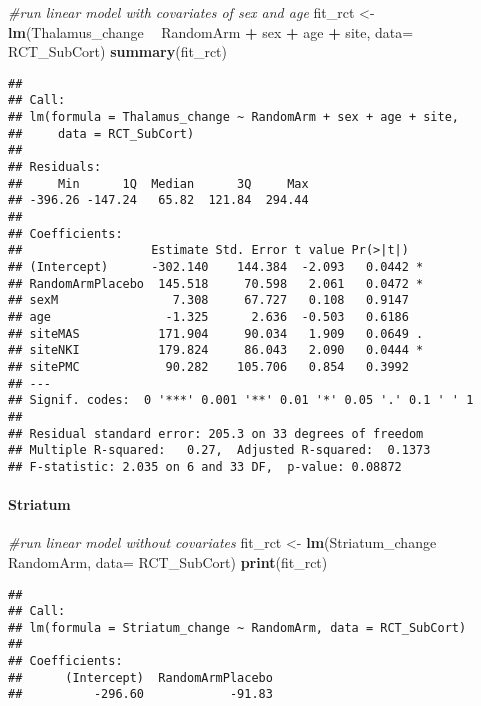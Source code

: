 \documentclass[]{article}
\newenvironment{Shaded}{\begin{snugshade}}{\end{snugshade}}
\newcommand{\KeywordTok}[1]{\textcolor[rgb]{0.13,0.29,0.53}{\textbf{#1}}}
\newcommand{\DataTypeTok}[1]{\textcolor[rgb]{0.13,0.29,0.53}{#1}}
\newcommand{\StringTok}[1]{\textcolor[rgb]{0.31,0.60,0.02}{#1}}
\newcommand{\CommentTok}[1]{\textcolor[rgb]{0.56,0.35,0.01}{\textit{#1}}}
\newcommand{\OperatorTok}[1]{\textcolor[rgb]{0.81,0.36,0.00}{\textbf{#1}}}
\newcommand{\NormalTok}[1]{#1}
\let\oldparagraph\paragraph
\renewcommand{\paragraph}[1]{\oldparagraph{#1}\mbox{}}
\theoremstyle{definition}
\theoremstyle{definition}
\theoremstyle{definition}
\theoremstyle{remark}
\begin{document}
\begin{Shaded}
\begin{Highlighting}[]
\CommentTok{#run linear model with covariates of sex and age}
\NormalTok{  fit_rct <-}\StringTok{ }\KeywordTok{lm}\NormalTok{(Thalamus_change }\OperatorTok{~}\StringTok{ }\NormalTok{RandomArm }\OperatorTok{+}\StringTok{ }\NormalTok{sex }\OperatorTok{+}\StringTok{ }\NormalTok{age }\OperatorTok{+}\StringTok{ }\NormalTok{site, }\DataTypeTok{data=}\NormalTok{ RCT_SubCort)}
  \KeywordTok{summary}\NormalTok{(fit_rct)}
\end{Highlighting}
\end{Shaded}

\begin{verbatim}
## 
## Call:
## lm(formula = Thalamus_change ~ RandomArm + sex + age + site, 
##     data = RCT_SubCort)
## 
## Residuals:
##     Min      1Q  Median      3Q     Max 
## -396.26 -147.24   65.82  121.84  294.44 
## 
## Coefficients:
##                  Estimate Std. Error t value Pr(>|t|)  
## (Intercept)      -302.140    144.384  -2.093   0.0442 *
## RandomArmPlacebo  145.518     70.598   2.061   0.0472 *
## sexM                7.308     67.727   0.108   0.9147  
## age                -1.325      2.636  -0.503   0.6186  
## siteMAS           171.904     90.034   1.909   0.0649 .
## siteNKI           179.824     86.043   2.090   0.0444 *
## sitePMC            90.282    105.706   0.854   0.3992  
## ---
## Signif. codes:  0 '***' 0.001 '**' 0.01 '*' 0.05 '.' 0.1 ' ' 1
## 
## Residual standard error: 205.3 on 33 degrees of freedom
## Multiple R-squared:   0.27,  Adjusted R-squared:  0.1373 
## F-statistic: 2.035 on 6 and 33 DF,  p-value: 0.08872
\end{verbatim}

\paragraph{Striatum}\label{striatum}

\begin{Shaded}
\begin{Highlighting}[]
\CommentTok{#run linear model without covariates}
\NormalTok{  fit_rct <-}\StringTok{ }\KeywordTok{lm}\NormalTok{(Striatum_change }\OperatorTok{~}\StringTok{ }\NormalTok{RandomArm, }\DataTypeTok{data=}\NormalTok{ RCT_SubCort)}
  \KeywordTok{print}\NormalTok{(fit_rct)}
\end{Highlighting}
\end{Shaded}

\begin{verbatim}
## 
## Call:
## lm(formula = Striatum_change ~ RandomArm, data = RCT_SubCort)
## 
## Coefficients:
##      (Intercept)  RandomArmPlacebo  
##          -296.60            -91.83
\end{verbatim}
\end{document}
